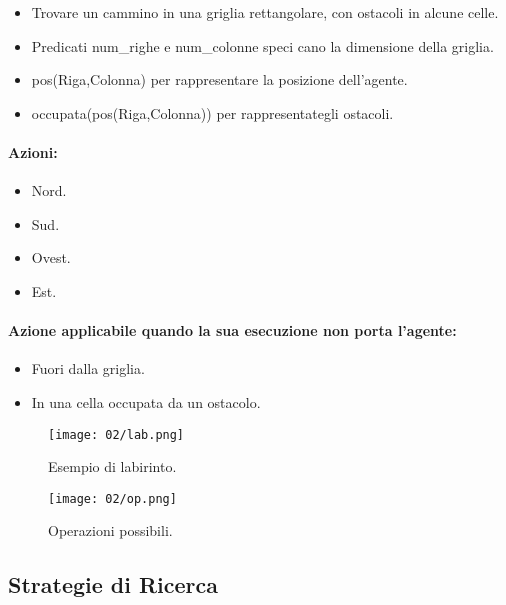 \begin{itemize}
  \item Trovare un cammino in una griglia rettangolare, con
ostacoli in alcune celle. 
\item Predicati num\_righe e num\_colonne speci cano la
dimensione della griglia. 
\item pos(Riga,Colonna) per rappresentare la posizione
dell’agente. 
\item occupata(pos(Riga,Colonna)) per rappresentategli ostacoli.
\end{itemize}

\paragraph{Azioni:}

\begin{itemize}
  \item Nord. 
  \item Sud. 
  \item Ovest. 
  \item Est. 
\end{itemize}

\paragraph{Azione applicabile quando la sua esecuzione non porta l’agente:}

\begin{itemize}
  \item Fuori dalla griglia. 
  \item In una cella occupata da un ostacolo.
\end{itemize}

\begin{figure}[h]
    \centering
    \texttt{[image: 02/lab.png]}
    \caption{Esempio di labirinto.}
\end{figure}

\begin{figure}[h]
    \centering
    \texttt{[image: 02/op.png]}
    \caption{Operazioni possibili.}
\end{figure}

\subsection{Strategie di Ricerca}















